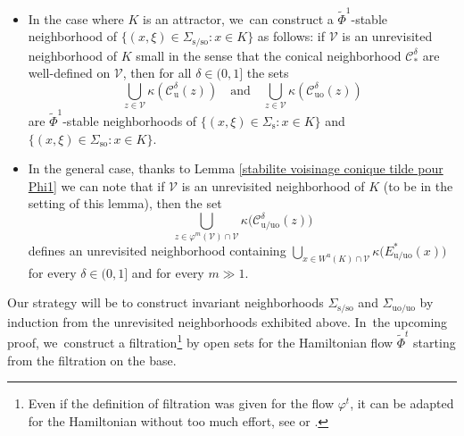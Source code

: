 \documentclass[JEP,XML,SOM,Unicode,NoEqCountersInSection,NoFloatCountersInSection,published]{cedram}
\newcommand{\rs}{\mathrm{s}}
\newcommand{\rso}{\mathrm{so}}
\newcommand{\ru}{\mathrm{u}}
\newcommand{\ruo}{\mathrm{uo}}
\theoremstyle{definition}
\theoremstyle{plain}
\newcommand{\Ccal}{\mathcal{C}}
\newcommand{\Vcal}{\mathcal{V}}
\begin{document}
\begin{itemize}
\item In the case where $K$ is an attractor, we~can construct a $\widetilde{\Phi}^1$-stable neighborhood of $\{(x,\xi)\in\Sigma_{\rs/\rso}: x\in K\}$ as follows: if $\Vcal$ is an unrevisited neighborhood of $K$ small in the sense that the conical neighborhood $\Ccal_*^{\delta}$ are well-defined on $\Vcal$, then for all $\delta\in(0,1]$ the sets
\[
\bigcup_{z \in \Vcal} \kappa \left(\Ccal_{\ru}^{\delta}(z) \right) \quad \text{and} \quad \bigcup_{z \in \Vcal} \kappa \left(\Ccal_{\ruo}^{\delta}(z) \right)
\]
are $\widetilde{\Phi}^1$-stable neighborhoods of $\{(x,\xi)\in\Sigma_{\rs}: x\in K\}$ and $\{(x,\xi)\in\Sigma_{\rso}: x\in K\}$.
\item In the general case, thanks to Lemma \ref{stabilite voisinage conique tilde pour Phi1} we can note that if $\Vcal$ is an unrevisited neighborhood of $K$ (to be in the setting of this lemma), then the set
\[
\bigcup_{z \in \varphi^m (\Vcal)\cap \Vcal} \kappa \bigl(\Ccal_{\ru/\ruo}^{\delta}(z) \bigr)
\]
defines an unrevisited neighborhood containing $\bigcup_{x \in W^\ru (K) \cap \Vcal } \kappa\bigl(E_{\ru/\ruo}^* (x) \bigr)$ for every $\delta\in(0,1]$ and for every $m \gg 1$.
\end{itemize}

Our strategy will be to construct invariant neighborhoods $\Sigma_{\rs/\rso}$ and $\Sigma_{\ruo/\ruo}$ by induction from the unrevisited neighborhoods exhibited above. In~the upcoming proof, we~construct a filtration\footnote{Even if the definition of filtration was given for the flow $\varphi^t$, it can be adapted for the Hamiltonian without too much effort, see \cite{shub} or \cite{smale}.} by open sets for the Hamiltonian flow $\widetilde{\Phi}^t$ starting from the filtration on the base.
\end{document}
